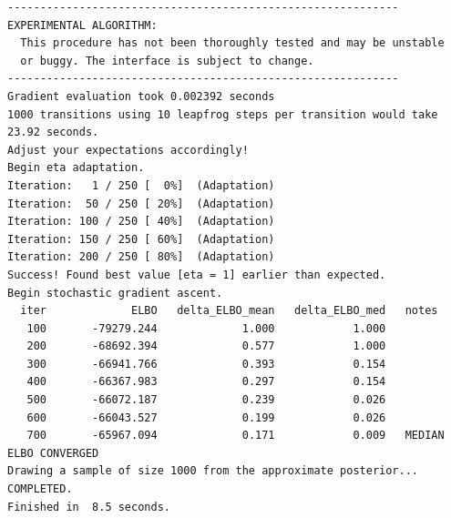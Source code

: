 \documentclass[
  11pt,
  a4paper,
  onecolumn]{article}
\newenvironment{Shaded}{}{}
\newcommand{\AttributeTok}[1]{\textcolor[rgb]{0.84,0.23,0.29}{#1}}
\newcommand{\CommentTok}[1]{\textcolor[rgb]{0.42,0.45,0.49}{#1}}
\newcommand{\FunctionTok}[1]{\textcolor[rgb]{0.44,0.26,0.76}{#1}}
\newcommand{\NormalTok}[1]{\textcolor[rgb]{0.14,0.16,0.18}{#1}}
\newcommand{\OtherTok}[1]{\textcolor[rgb]{0.44,0.26,0.76}{#1}}
\newcommand{\SpecialCharTok}[1]{\textcolor[rgb]{0.00,0.36,0.77}{#1}}
\newcommand{\StringTok}[1]{\textcolor[rgb]{0.01,0.18,0.38}{#1}}
\begin{document}
\begin{verbatim}
------------------------------------------------------------ 
EXPERIMENTAL ALGORITHM: 
  This procedure has not been thoroughly tested and may be unstable 
  or buggy. The interface is subject to change. 
------------------------------------------------------------ 
Gradient evaluation took 0.002392 seconds 
1000 transitions using 10 leapfrog steps per transition would take 23.92 seconds. 
Adjust your expectations accordingly! 
Begin eta adaptation. 
Iteration:   1 / 250 [  0%]  (Adaptation) 
Iteration:  50 / 250 [ 20%]  (Adaptation) 
Iteration: 100 / 250 [ 40%]  (Adaptation) 
Iteration: 150 / 250 [ 60%]  (Adaptation) 
Iteration: 200 / 250 [ 80%]  (Adaptation) 
Success! Found best value [eta = 1] earlier than expected. 
Begin stochastic gradient ascent. 
  iter             ELBO   delta_ELBO_mean   delta_ELBO_med   notes  
   100       -79279.244             1.000            1.000 
   200       -68692.394             0.577            1.000 
   300       -66941.766             0.393            0.154 
   400       -66367.983             0.297            0.154 
   500       -66072.187             0.239            0.026 
   600       -66043.527             0.199            0.026 
   700       -65967.094             0.171            0.009   MEDIAN ELBO CONVERGED 
Drawing a sample of size 1000 from the approximate posterior...  
COMPLETED. 
Finished in  8.5 seconds.
\end{verbatim}

\begin{Shaded}
\end{Shaded}

\begin{Shaded}
\end{Shaded}
\end{document}
